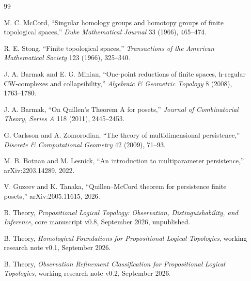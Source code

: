\documentclass[11pt]{article}
\theoremstyle{definition}
\begin{document}
\begin{thebibliography}{99}

M. C. McCord,
``Singular homology groups and homotopy groups of finite topological spaces,''
\emph{Duke Mathematical Journal} 33 (1966), 465--474.

R. E. Stong,
``Finite topological spaces,''
\emph{Transactions of the American Mathematical Society} 123 (1966), 325--340.

J. A. Barmak and E. G. Minian,
``One-point reductions of finite spaces, h-regular CW-complexes and collapsibility,''
\emph{Algebraic \& Geometric Topology} 8 (2008), 1763--1780.

J. A. Barmak,
``On Quillen's Theorem A for posets,''
\emph{Journal of Combinatorial Theory, Series A} 118 (2011), 2445--2453.

G. Carlsson and A. Zomorodian,
``The theory of multidimensional persistence,''
\emph{Discrete \& Computational Geometry} 42 (2009), 71--93.

M. B. Botnan and M. Lesnick,
``An introduction to multiparameter persistence,''
arXiv:2203.14289, 2022.

V. Guzeev and K. Tanaka,
``Quillen--McCord theorem for persistence finite posets,''
arXiv:2605.11615, 2026.

B. Theory,
\emph{Propositional Logical Topology: Observation, Distinguishability, and Inference},
core manuscript v0.8, September 2026, unpublished.

B. Theory,
\emph{Homological Foundations for Propositional Logical Topologies},
working research note v0.1, September 2026.

B. Theory,
\emph{Observation Refinement Classification for Propositional Logical Topologies},
working research note v0.2, September 2026.

\end{thebibliography}
\end{document}
